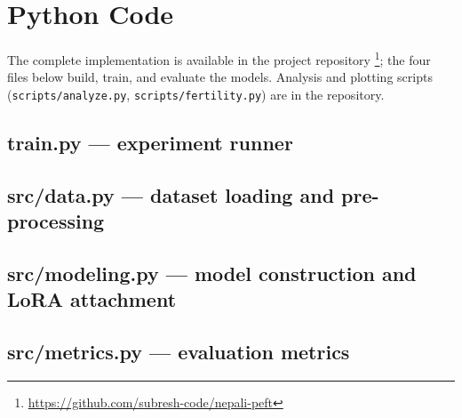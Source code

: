 \documentclass[11pt,a4paper]{article}
\begin{document}




\clearpage
\appendix

\section{Python Code}
\label{app:code}

The complete implementation is available in the project repository%
\footnote{\url{https://github.com/subresh-code/nepali-peft}}; the four
files below build, train, and evaluate the models. Analysis and plotting
scripts (\texttt{scripts/analyze.py}, \texttt{scripts/fertility.py}) are
in the repository.

\subsection{train.py --- experiment runner}


\subsection{src/data.py --- dataset loading and pre-processing}


\subsection{src/modeling.py --- model construction and LoRA attachment}


\subsection{src/metrics.py --- evaluation metrics}

\end{document}
